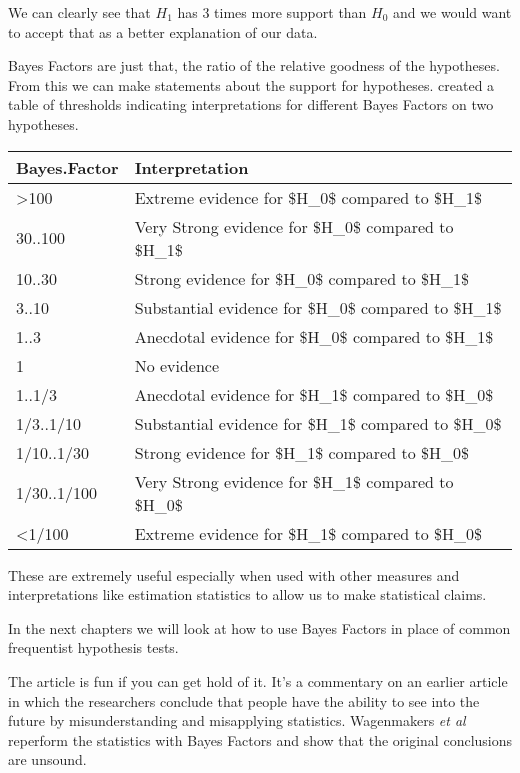 \documentclass[
]{book}
\newenvironment{sidenote}
{ \begin{tcolorbox}[colbacktitle=blue!50!white,
title=huh?,coltitle=white,
fonttitle=\bfseries] }
{  \end{tcolorbox} }
\begin{document}
We can clearly see that \(H_1\) has 3 times more support than \(H_0\) and we would want to accept that as a better explanation of our data.

Bayes Factors are just that, the ratio of the relative goodness of the hypotheses. From this we can make statements about the support for hypotheses. \citet{wagenmakers2011} created a table of thresholds indicating interpretations for different Bayes Factors on two hypotheses.

\begin{tabular}{l|l}
\hline
Bayes.Factor & Interpretation\\
\hline
>100 & Extreme  evidence for \$H\_0\$ compared to \$H\_1\$\\
\hline
30..100 & Very Strong  evidence for \$H\_0\$ compared to \$H\_1\$\\
\hline
10..30 & Strong  evidence for \$H\_0\$ compared to \$H\_1\$\\
\hline
3..10 & Substantial  evidence for \$H\_0\$ compared to \$H\_1\$\\
\hline
1..3 & Anecdotal  evidence for \$H\_0\$ compared to \$H\_1\$\\
\hline
1 & No evidence\\
\hline
1..1/3 & Anecdotal  evidence for \$H\_1\$ compared to \$H\_0\$\\
\hline
1/3..1/10 & Substantial  evidence for \$H\_1\$ compared to \$H\_0\$\\
\hline
1/10..1/30 & Strong  evidence for \$H\_1\$ compared to \$H\_0\$\\
\hline
1/30..1/100 & Very Strong  evidence for \$H\_1\$ compared to \$H\_0\$\\
\hline
<1/100 & Extreme  evidence for \$H\_1\$ compared to \$H\_0\$\\
\hline
\end{tabular}

These are extremely useful especially when used with other measures and interpretations like estimation statistics to allow us to make statistical claims.

In the next chapters we will look at how to use Bayes Factors in place of common frequentist hypothesis tests.

\begin{sidenote}
The \citet{wagenmakers2011} article is fun if you can get hold of it. It's a commentary on an earlier article in which the researchers conclude that people have the ability to see into the future by misunderstanding and misapplying statistics. Wagenmakers \emph{et al} reperform the statistics with Bayes Factors and show that the original conclusions are unsound.
\end{sidenote}
\end{document}
